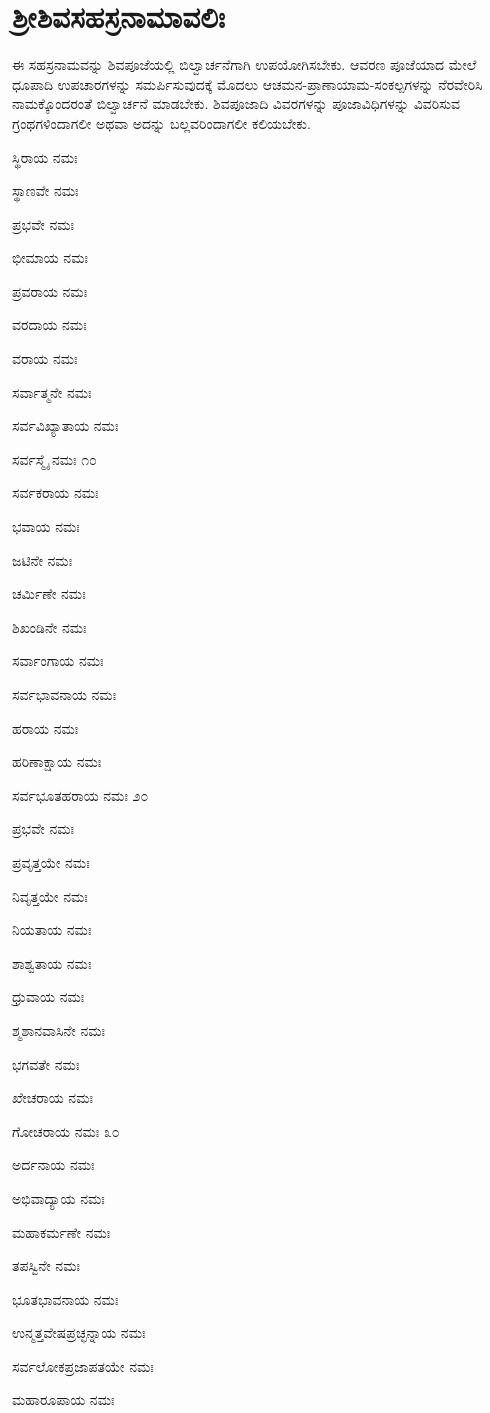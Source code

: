
\chapter{ಶ್ರೀಶಿವಸಹಸ್ರನಾಮಾವಲಿಃ}

ಈ ಸಹಸ್ರನಾಮವನ್ನು ಶಿವಪೂಜೆಯಲ್ಲಿ ಬಿಲ್ವಾರ್ಚನೆಗಾಗಿ ಉಪಯೋಗಿಸಬೇಕು. ಆವರಣ ಪೂಜೆಯಾದ ಮೇಲೆ ಧೂಪಾದಿ ಉಪಚಾರಗಳನ್ನು ಸಮರ್ಪಿಸುವುದಕ್ಕೆ ಮೊದಲು ಆಚಮನ-ಪ್ರಾಣಾಯಾಮ-ಸಂಕಲ್ಪಗಳನ್ನು ನೆರವೇರಿಸಿ ನಾಮಕ್ಕೊಂದರಂತೆ ಬಿಲ್ವಾರ್ಚನೆ ಮಾಡಬೇಕು. ಶಿವಪೂಜಾದಿ ವಿವರಗಳನ್ನು ಪೂಜಾವಿಧಿಗಳನ್ನು ವಿವರಿಸುವ ಗ್ರಂಥಗಳಿಂದಾಗಲೀ ಅಥವಾ ಅದನ್ನು ಬಲ್ಲವರಿಂದಾಗಲೀ ಕಲಿಯಬೇಕು.

ಸ್ಥಿರಾಯ ನಮಃ

ಸ್ಥಾಣವೇ ನಮಃ

ಪ್ರಭವೇ ನಮಃ

ಭೀಮಾಯ ನಮಃ

ಪ್ರವರಾಯ ನಮಃ

ವರದಾಯ ನಮಃ

ವರಾಯ ನಮಃ

ಸರ್ವಾತ್ಮನೇ ನಮಃ

ಸರ್ವವಿಖ್ಯಾತಾಯ ನಮಃ

ಸರ್ವಸ್ಮೈ ನಮಃ \num{೧೦}

ಸರ್ವಕರಾಯ ನಮಃ

ಭವಾಯ ನಮಃ

ಜಟಿನೇ ನಮಃ

ಚರ್ಮಿಣೇ ನಮಃ

ಶಿಖಂಡಿನೇ ನಮಃ

ಸರ್ವಾಂಗಾಯ ನಮಃ

ಸರ್ವಭಾವನಾಯ ನಮಃ

ಹರಾಯ ನಮಃ

ಹರಿಣಾಕ್ಷಾಯ ನಮಃ

ಸರ್ವಭೂತಹರಾಯ ನಮಃ \num{೨೦}

ಪ್ರಭವೇ ನಮಃ

ಪ್ರವೃತ್ತಯೇ ನಮಃ

ನಿವೃತ್ತಯೇ ನಮಃ

ನಿಯತಾಯ ನಮಃ

ಶಾಶ್ವತಾಯ ನಮಃ

ಧ್ರುವಾಯ ನಮಃ

ಶ್ಮಶಾನವಾಸಿನೇ ನಮಃ

ಭಗವತೇ ನಮಃ

ಖೇಚರಾಯ ನಮಃ

ಗೋಚರಾಯ ನಮಃ \num{೩೦}

ಅರ್ದನಾಯ ನಮಃ

ಅಭಿವಾದ್ಯಾಯ ನಮಃ

ಮಹಾಕರ್ಮಣೇ ನಮಃ

ತಪಸ್ವಿನೇ ನಮಃ

ಭೂತಭಾವನಾಯ ನಮಃ

ಉನ್ಮತ್ತವೇಷಪ್ರಚ್ಛನ್ನಾಯ ನಮಃ

ಸರ್ವಲೋಕಪ್ರಜಾಪತಯೇ ನಮಃ

ಮಹಾರೂಪಾಯ ನಮಃ

